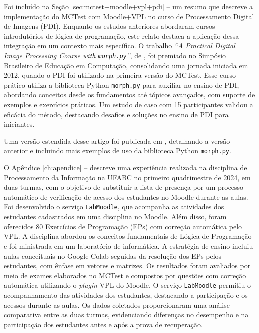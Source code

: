 Foi incluído na Seção \ref{sec:mctest+moodle+vpl+pdi} --  um resumo que descreve a implementação do MCTest com Moodle+VPL no curso de Processamento Digital de Imagens (PDI). Enquanto os estudos anteriores abordaram cursos introdutórios de lógica de programação, este relato destaca a aplicação dessa integração em um contexto mais específico. O trabalho \textit{``A Practical Digital Image Processing Course with \texttt{morph.py}''}, de , foi premiado no Simpósio Brasileiro de Educação em Computação, consolidando uma jornada iniciada em 2012, quando o PDI foi utilizado na primeira versão do MCTest. Esse curso prático utiliza a biblioteca Python \texttt{morph.py} para auxiliar no ensino de PDI, abordando conceitos desde os fundamentos até tópicos avançados, com suporte de exemplos e exercícios práticos. Um estudo de caso com 15 participantes validou a eficácia do método, destacando desafios e soluções no ensino de PDI para iniciantes.

Uma versão estendida desse artigo foi publicada em , detalhando a versão anterior e incluindo mais exemplos de uso da biblioteca Python \texttt{morph.py}.

O Apêndice \ref{ch:apendice} --  descreve uma experiência realizada na disciplina de Processamento da Informação na UFABC no primeiro quadrimestre de 2024, em duas turmas, com o objetivo de substituir a lista de presença por um processo automático de verificação de acesso dos estudantes no Moodle durante as aulas. Foi desenvolvido o serviço \texttt{LabMoodle}, que acompanha as atividades dos estudantes cadastrados em uma disciplina no Moodle. Além disso, foram oferecidos 80 Exercícios de Programação (EPs) com correção automática pelo VPL. A disciplina abordou os conceitos fundamentais de Lógica de Programação e foi ministrada em um laboratório de informática. A estratégia de ensino incluiu aulas conceituais no Google Colab seguidas da resolução dos EPs pelos estudantes, com ênfase em vetores e matrizes. Os resultados foram avaliados por meio de exames elaborados no MCTest e compostos por questões com correção automática utilizando o \textit{plugin} VPL do Moodle. O serviço \texttt{LabMoodle} permitiu o acompanhamento das atividades dos estudantes, destacando a participação e os acessos durante as aulas. Os dados coletados proporcionaram uma análise comparativa entre as duas turmas, evidenciando diferenças no desempenho e na participação dos estudantes antes e após a prova de recuperação. 

